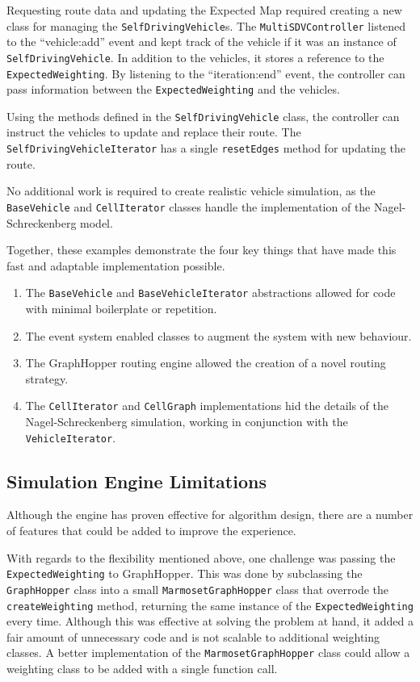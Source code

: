 \documentclass[ %
                    author={Alexander Hill},
                supervisor={Dr. Benjamin Sach},
                    degree={MEng},
                     title={MARMOSET},
                  subtitle={Multi-Agent Route Management using Online Simulation for Efficient Transportation},
                      type={research},
                      year={2016} ]{dissertation}
\begin{document}
Requesting route data and updating the Expected Map required creating a new
class for managing the \texttt{SelfDrivingVehicle}s. The
\texttt{MultiSDVController} listened to the ``vehicle:add'' event and kept track
of the vehicle if it was an instance of \texttt{SelfDrivingVehicle}. In addition
to the vehicles, it stores a reference to the \texttt{ExpectedWeighting}. By
listening to the ``iteration:end'' event, the controller can pass information
between the \texttt{ExpectedWeighting} and the vehicles.

Using the methods defined in the \texttt{SelfDrivingVehicle} class, the
controller can instruct the vehicles to update and replace their route. The
\texttt{SelfDrivingVehicleIterator} has a single \texttt{resetEdges} method for
updating the route.

No additional work is required to create realistic vehicle simulation, as the
\texttt{BaseVehicle} and \texttt{Cell\-Iterator} classes handle the implementation
of the Nagel-Schreckenberg model.

Together, these examples demonstrate the four key things that have made this
fast and adaptable implementation possible.

\begin{enumerate}
    \item The \texttt{BaseVehicle} and \texttt{BaseVehicleIterator} abstractions
        allowed for code with minimal boilerplate or repetition.
    \item The event system enabled classes to augment the system with new
        behaviour.
    \item The GraphHopper routing engine allowed the creation of a novel
        routing strategy.
    \item The \texttt{CellIterator} and \texttt{CellGraph} implementations
        hid the details of the Nagel-Schreckenberg simulation, working in
        conjunction with the \texttt{VehicleIterator}.
\end{enumerate}

\subsection{Simulation Engine Limitations}

Although the engine has proven effective for algorithm design, there are a
number of features that could be added to improve the experience.

With regards to the flexibility mentioned above, one challenge was passing
the \texttt{ExpectedWeighting} to GraphHopper. This was done by subclassing the
\texttt{GraphHopper} class into a small \texttt{MarmosetGraphHopper} class that
overrode the \texttt{createWeighting} method, returning the same instance of the
\texttt{ExpectedWeighting} every time. Although this was effective at solving
the problem at hand, it added a fair amount of unnecessary code and is not
scalable to additional weighting classes. A better implementation of the
\texttt{MarmosetGraphHopper} class could allow a weighting class
to be added with a single function call.
\end{document}
